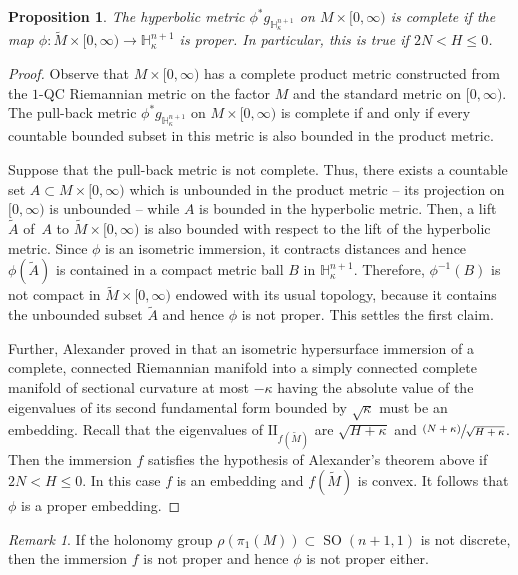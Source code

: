 \documentclass[JEP,XML,SOM,Unicode]{cedram}
\DeclareMathOperator{\SO}{SO}
\newcommand{\II}{\mathrm{II}}
\newcommand{\psfrac}[2]{\sfrac{(#1)}{#2}}
\newtheorem{proposition}[theorem]{Proposition}
\theoremstyle{definition}
\theoremstyle{remark}
\newtheorem{remark}[theorem]{Remark}
\numberwithin{equation}{section}
\begin{document}
\begin{proposition}\label{completemetric}
The hyperbolic metric $\phi^*g_{\mathbb H_{\kappa}^{n+1}}$ on $M\times [0,\infty)$ is complete
if the map $\phi: \widetilde{M}\times [0,\infty) \to \mathbb H_{\kappa}^{n+1}$ is proper.
In particular, this is true if $2N < H \leq 0$.
\end{proposition}
\begin{proof}
Observe that $M\times [0,\infty)$ has a complete product metric constructed from the $1$-QC Riemannian metric on the factor $M$ and the standard metric on $[0,\infty)$. The pull-back metric $\phi^*g_{\mathbb H_{\kappa}^{n+1}}$ on $M\times [0,\infty)$ is complete if and only if every countable bounded subset in this metric is also bounded in the product metric.

Suppose that the pull-back metric is not complete. Thus, there exists a countable set $A\subset M\times [0,\infty)$
which is unbounded in the product metric -- \ie its projection on $[0,\infty)$ is unbounded -- while $A$ is bounded in the hyperbolic metric. Then, a lift~$\widetilde{A}$ of~$A$ to $\widetilde{M}\times [0,\infty)$ is also bounded with respect
to the lift of the hyperbolic metric. Since $\phi$ is an isometric immersion, it contracts distances and hence
$\phi(\widetilde{A})$ is contained in a compact metric ball $B$ in
$\mathbb H_{\kappa}^{n+1}$. Therefore, $\phi^{-1}(B)$ is not compact
in $\widetilde{M}\times [0,\infty)$ endowed with its usual topology, because it contains the unbounded subset
$\widetilde{A}$ and hence $\phi$ is not proper. This settles the first claim.

Further, Alexander proved in \cite[Prop.\,2]{Al} that an isometric hypersurface immersion of a complete, connected
Riemannian manifold into a simply connected complete manifold of sectional curvature at most $-\kappa$ having
the absolute value of the eigenvalues of its second fundamental form bounded by $\sqrt{\kappa}$ must be
an embedding. Recall that the eigenvalues of $\II_{f(\widetilde{M})}$ are $\sqrt{H+\kappa}$ and $\psfrac{N+\kappa}{\sqrt{H+\kappa}}$. Then the immersion $f$ satisfies the hypothesis of Alexander's theorem above if
$2N < H \leq 0$. In this case $f$ is an embedding and $f(\widetilde{M})$ is convex. It follows that
$\phi$ is a proper embedding.
\end{proof}

\begin{remark}
If the holonomy group $\rho(\pi_1(M))\subset \SO(n+1,1)$ is not discrete, then the immersion $f$ is not proper and
hence $\phi$ is not proper either.
\end{remark}
\end{document}
